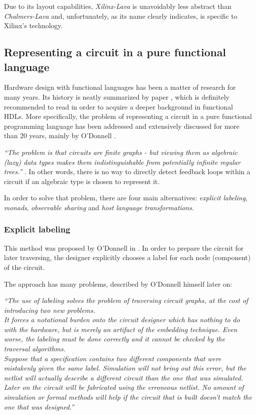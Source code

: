 Due to its layout capabilities, \textit{Xilinx-Lava} is unavoidably
less abstract than \textit{Chalmers-Lava} and, unfortunately, as its name
clearly indicates, is specific to Xilinx's technology.
 
\subsection{Representing a circuit in a pure functional language}
Hardware design with functional languages has been a matter of research for
many years. Its history is neatly summarized by paper  \cite{functionalhdls},
which is definitely recommended to read in order to acquire a deeper
background in functional HDLs.  More specifically, the problem of representing
a circuit in a pure functional programming language has been addressed and
extensively discussed for more than 20 years, mainly by O'Donnell
 \cite{recursion,netlists,hwrec,osharing,panchitos,hydra:th}.


\textit{``The problem is that circuits are finite graphs - but viewing
  them as algebraic (lazy) data types makes them indistinguishable
  from potentially infinite regular trees.''} \cite{osharing}. In other
words, there is no way to directly detect feedback loops within a
circuit if an algebraic type is chosen to represent it.

In order to solve that problem, there are four main alternatives:
\textit{explicit labeling}, \textit{monads}, \textit{observable
  sharing} and \textit{host language transformations}.



\subsubsection{Explicit labeling}
  This method was proposed by
  O'Donnell in  \cite{netlists}. In order to prepare the circuit for
  later traversing, the designer explicitly chooses a label for each
  node (component) of the circuit. 

  The approach has many problems, described by O'Donnell himself
  later on:
  
  \textit{``The use of labeling solves the
    problem of traversing circuit graphs, at the cost of introducing
    two new problems. \\ It forces a notational burden onto the
    circuit designer which has nothing to do with the hardware, but is
    merely an artifact of the embedding technique.  Even worse, the
    labeling must be done correctly and it cannot be
    checked by the traversal algorithms.\\
    Suppose that a specification contains two different components that
    were mistakenly given the same label. Simulation will not bring
    out this error, but the netlist will actually describe a different
    circuit than the one that was simulated.  Later on the circuit will
    be fabricated using the erroneous netlist. No amount of simulation
    or formal methods will help if the circuit that is built doesn't
    match the one that was designed.''} \cite{hydra:th}

